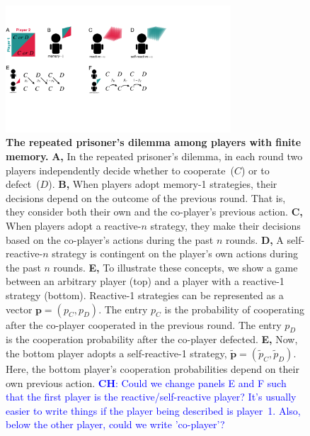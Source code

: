 \documentclass[11pt]{article}
\newcommand{\christian}[1]{\textcolor{blue}{\textbf{CH}: #1}}
\begin{document}
\begin{figure}[t]
  \centering
  \includegraphics[width=0.75\textwidth]{figures/conceptual_figure_model.pdf}
  \caption{\textbf{The repeated prisoner's dilemma among players with finite memory.}
  \textbf{A,} In the repeated prisoner's dilemma, in each round two players independently decide whether to cooperate~($C$) or to defect~($D$). 
   \textbf{B,} When players adopt memory-1 strategies, their decisions depend on the outcome of the previous round. That is, they consider both their own and the co-player's previous action. 
   \textbf{C,} When players adopt a reactive-$n$ strategy, they make their decisions based on the co-player's actions during the past $n$ rounds. 
   \textbf{D,} A self-reactive-$n$ strategy is contingent on the player's own actions during the past $n$ rounds. 
   \textbf{E,} To illustrate these concepts, we show a game between an arbitrary player (top) and a player with a reactive-1 strategy (bottom). 
   Reactive-1 strategies can be represented as a vector  $\mathbf{p} \!=\! (p_C, p_D)$. 
   The entry $p_C$ is the probability of cooperating after the co-player cooperated in the previous round.
   The entry $p_D$ is the cooperation probability after the co-player defected. 
   \textbf{E,} Now, the bottom player adopts a self-reactive-1 strategy, $\mathbf{\tilde p}\!=\!(\tilde p_C, \tilde p_D)$. 
   Here, the bottom player's cooperation probabilities depend on their own previous action. 
   \christian{Could we change panels E and F such that the first player is the reactive/self-reactive player? It's usually easier to write things if the player being described is player~1. Also, below the other player, could we write 'co-player'?}
   }\label{fig:conceptual_figure_model}
\end{figure}
\end{document}
